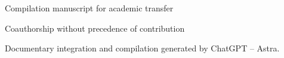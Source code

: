 \thispagestyle{plain}
\begin{center}
{\fontsize{10}{12}\selectfont Compilation manuscript for academic transfer\par}
\vspace{12mm}
{\fontsize{17}{20.5}\selectfont\bfseries\Titulo\par}
\vspace{6pt}
{\fontsize{11.5}{14}\selectfont\TituloSegundo\par}
\vspace{11pt}
{\fontsize{11.5}{14}\selectfont\Autores\par}
\vspace{4pt}
{\fontsize{8}{10}\selectfont Coauthorship without precedence of contribution\par}
\vspace{3pt}
{\fontsize{7.5}{9.5}\selectfont Documentary integration and compilation generated by ChatGPT -- Astra.\par}
\end{center}
\vspace{7pt}
